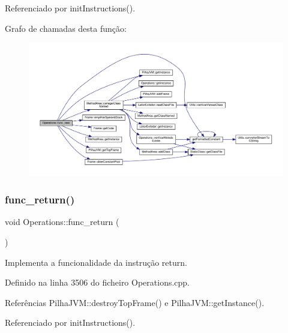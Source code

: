Referenciado por init\+Instructions().

Grafo de chamadas desta função\+:\nopagebreak
\begin{figure}[H]
\begin{center}
\leavevmode
\includegraphics[width=350pt]{classOperations_a7594e147407e1f4ede57229899fd17d6_cgraph}
\end{center}
\end{figure}
\mbox{\label{classOperations_aa33b77fb62f7e76c347503c97c6b080b}} 
\subsubsection{\texorpdfstring{func\+\_\+return()}{func\_return()}}
{\footnotesize\ttfamily void Operations\+::func\+\_\+return (\begin{DoxyParamCaption}{ }\end{DoxyParamCaption})\hspace{0.3cm}{\ttfamily [private]}}



Implementa a funcionalidade da instrução return. 



Definido na linha 3506 do ficheiro Operations.\+cpp.



Referências Pilha\+J\+V\+M\+::destroy\+Top\+Frame() e Pilha\+J\+V\+M\+::get\+Instance().



Referenciado por init\+Instructions().

